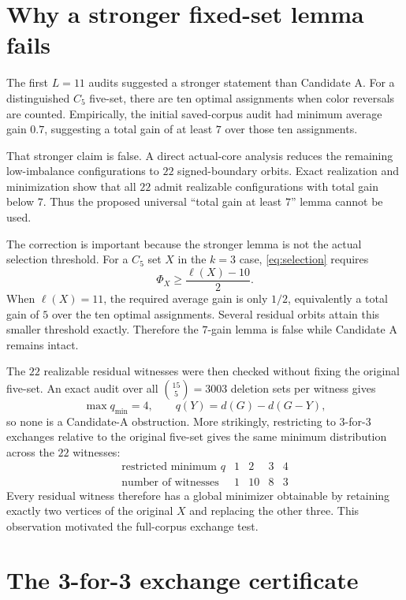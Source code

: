 \documentclass[11pt]{article}
\newcommand{\dd}{d}
\begin{document}
\section{Why a stronger fixed-set lemma fails}
\label{sec:failure}

The first $L=11$ audits suggested a stronger statement than Candidate A.
For a distinguished $C_5$ five-set, there are ten optimal assignments when
color reversals are counted.  Empirically, the initial saved-corpus audit
had minimum average gain $0.7$, suggesting a total gain of at least $7$
over those ten assignments.

That stronger claim is false.  A direct actual-core analysis reduces the
remaining low-imbalance configurations to $22$ signed-boundary orbits.
Exact realization and minimization show that all $22$ admit realizable
configurations with total gain below $7$.  Thus the proposed universal
``total gain at least $7$'' lemma cannot be used.

The correction is important because the stronger lemma is not the actual
selection threshold.  For a $C_5$ set $X$ in the $k=3$ case,
\eqref{eq:selection} requires
\[
\Phi_X\ge \frac{\ell(X)-10}{2}.
\]
When $\ell(X)=11$, the required average gain is only $1/2$, equivalently a
total gain of $5$ over the ten optimal assignments.  Several residual
orbits attain this smaller threshold exactly.  Therefore the $7$-gain
lemma is false while Candidate A remains intact.

The $22$ realizable residual witnesses were then checked without fixing the
original five-set.  An exact audit over all $\binom{15}{5}=3003$ deletion
sets per witness gives
\[
\max q_{\min}=4,
\qquad
q(Y)=\dd(G)-\dd(G-Y),
\]
so none is a Candidate-A obstruction.  More strikingly, restricting to
3-for-3 exchanges relative to the original five-set gives the same
minimum distribution across the $22$ witnesses:
\[
\begin{array}{c|rrrr}
\text{restricted minimum }q & 1 & 2 & 3 & 4\\ \hline
\text{number of witnesses} & 1 & 10 & 8 & 3
\end{array}
\]
Every residual witness therefore has a global minimizer obtainable by
retaining exactly two vertices of the original $X$ and replacing the other
three.  This observation motivated the full-corpus exchange test.

\section{The 3-for-3 exchange certificate}
\label{sec:3for3}
\end{document}
